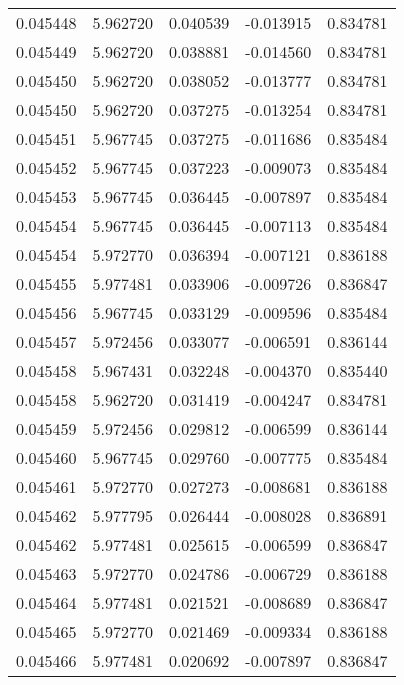 \begin{tabular}{lrrrr}
0.045448    &  5.962720 &  0.040539 & -0.013915 &             0.834781 \\
0.045449    &  5.962720 &  0.038881 & -0.014560 &             0.834781 \\
0.045450    &  5.962720 &  0.038052 & -0.013777 &             0.834781 \\
0.045450    &  5.962720 &  0.037275 & -0.013254 &             0.834781 \\
0.045451    &  5.967745 &  0.037275 & -0.011686 &             0.835484 \\
0.045452    &  5.967745 &  0.037223 & -0.009073 &             0.835484 \\
0.045453    &  5.967745 &  0.036445 & -0.007897 &             0.835484 \\
0.045454    &  5.967745 &  0.036445 & -0.007113 &             0.835484 \\
0.045454    &  5.972770 &  0.036394 & -0.007121 &             0.836188 \\
0.045455    &  5.977481 &  0.033906 & -0.009726 &             0.836847 \\
0.045456    &  5.967745 &  0.033129 & -0.009596 &             0.835484 \\
0.045457    &  5.972456 &  0.033077 & -0.006591 &             0.836144 \\
0.045458    &  5.967431 &  0.032248 & -0.004370 &             0.835440 \\
0.045458    &  5.962720 &  0.031419 & -0.004247 &             0.834781 \\
0.045459    &  5.972456 &  0.029812 & -0.006599 &             0.836144 \\
0.045460    &  5.967745 &  0.029760 & -0.007775 &             0.835484 \\
0.045461    &  5.972770 &  0.027273 & -0.008681 &             0.836188 \\
0.045462    &  5.977795 &  0.026444 & -0.008028 &             0.836891 \\
0.045462    &  5.977481 &  0.025615 & -0.006599 &             0.836847 \\
0.045463    &  5.972770 &  0.024786 & -0.006729 &             0.836188 \\
0.045464    &  5.977481 &  0.021521 & -0.008689 &             0.836847 \\
0.045465    &  5.972770 &  0.021469 & -0.009334 &             0.836188 \\
0.045466    &  5.977481 &  0.020692 & -0.007897 &             0.836847 \\

\end{tabular}
